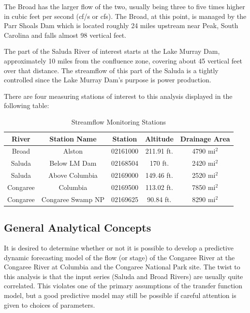 \documentclass[12pt]{report}
\begin{document}
The Broad has the larger flow of the two, usually being three to
five times higher in cubic feet per second (cf/s or cfs). The
Broad, at this point, is managed by the Parr Shoals Dam which is
located roughly 24 miles upstream near Peak, South Carolina and
falls almost 98 vertical feet.

The part of the Saluda River of interest starts at the Lake Murray
Dam, approximately 10 miles from the confluence zone, covering
about 45 vertical feet over that distance.  The streamflow of this
part of the Saluda is a tightly controlled since the Lake Murray
Dam's purpose is power production.

There are four measuring stations of interest to this analysis
displayed in the following table:

\begin{table}[pt]\begin{tabular}{|c|c|c|c|c|} \hline
  \textbf{River} & \textbf{Station Name} & \textbf{Station}& \textbf{ Altitude} & \textbf{Drainage Area}\\
  \hline
  Broad & Alston & 02161000 & 211.91 ft. & 4790 mi$^2$ \\
  Saluda & Below LM Dam & 02168504 & 170 ft. & 2420 mi$^2$ \\
  Saluda & Above Columbia & 02169000 & 149.46 ft. & 2520 mi$^2$ \\
  Congaree & Columbia & 02169500 & 113.02 ft. & 7850 mi$^2$ \\
  Congaree & Congaree Swamp NP & 02169625 & 90.84 ft. & 8290 mi$^2$ \\
  \hline
  \end{tabular}  \caption{Streamflow Monitoring Stations}\label{tab:SMS}
  \end{table}

\subsection{General Analytical Concepts}
It is desired to determine whether or not it is possible to
develop a predictive dynamic forecasting model of the flow (or
stage) of the Congaree River at the Congaree River at Columbia and
the Congaree National Park site.  The twist to this analysis is
that the input series (Saluda and Broad Rivers) are usually quite
correlated. This violates one of the primary assumptions of the
transfer function model, but a good predictive model may still be
possible if careful attention is given to choices of parameters.
\end{document}
